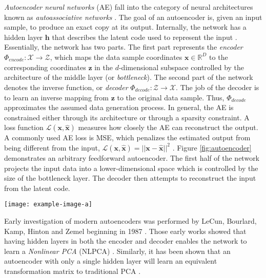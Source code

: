 \textit{Autoencoder neural networks} (AE) fall into the category of neural architectures known as \textit{autoassociative networks} \citep{Rojas1996AssociativeNetworks}.  The goal of an autoencoder is, given an input sample, to produce an exact copy at its output.  Internally, the network has a hidden layer $\bm{h}$ that describes the latent code used to represent the input \citep{Goodfellow2016DeepLearning}.  Essentially, the network has two parts.  The first part represents the \textit{encoder} $\Phi_{encode}:\mathcal{X} \rightarrow \mathcal{Z}$, which maps the data sample coordinates $\bm{x} \in \mathbb{R}^{D}$ to the corresponding coordinates $\bm{z}$ in the $d$-dimensional subspace controlled by the architecture of the middle layer (or \textit{bottleneck}).  The second part of the network denotes the inverse function, or \textit{decoder} $\Phi_{decode}:\mathcal{Z} \rightarrow \hat{\mathcal{X}}$.   The job of the decoder is to learn an inverse mapping from $\bm{z}$ to the original data sample.  Thus, $\Phi_{decode}$ approximates the assumed data generation process.  In general,  the AE is constrained either through its architecture or through a sparsity constraint.  A loss function $\mathcal{L}(\bm{x},\hat{\bm{x}})$  measures how closely the AE can reconstruct the output.  A commonly used AE loss is MSE, which penalizes the estimated output from being different from the input, $\mathcal{L}(\bm{x},\hat{\bm{x}}) = ||\bm{x} -  \hat{\bm{x}}||^{2}$ \citep{Ball2017DLRemoteSensing}.  Figure \ref{fig:autoencoder} demonstrates an arbitrary feedforward autoencoder.  The first half of the network projects the input data into a lower-dimensional space which is controlled by the size of the bottleneck layer.  The decoder then attempts to reconstruct the input from the latent code.
\begin{center}
	\begin{figure*}[h]
		\centering
		\texttt{[image: example-image-a]}
		\caption[Autoencoder neural network]{}
		\label{fig:autoencoder}
	\end{figure*}
\end{center}

Early investigation of modern autoencoders was performed by LeCun, Bourlard, Kamp, Hinton and Zemel beginning in 1987 \citep{Goodfellow2016DeepLearning, Bengio2014RepLearningReview}.  Those early works showed that having hidden layers in both the encoder and decoder enables the network to learn a \textit{Nonlinear PCA} (NLPCA) \citep{Scholz2008NonlinearPCA}. Similarly, it has been shown that an autoencoder with only a single hidden layer will learn an equivalent transformation matrix to traditional PCA \citep{Bengio2014RepLearningReview}.

